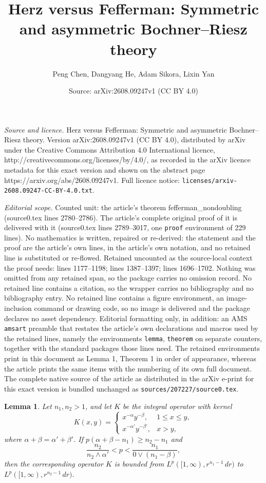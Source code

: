 \documentclass[10pt,a4paper]{amsart}
\title{Herz versus Fefferman: Symmetric and asymmetric Bochner--Riesz theory}
\author{Peng Chen, Dangyang He, Adam Sikora, Lixin Yan}
\date{Source: arXiv:2608.09247v1 (CC BY 4.0)}
\newtheorem{lemma}{Lemma}
\begin{document}
\maketitle

\noindent\emph{Source and licence.} Herz versus Fefferman: Symmetric and asymmetric Bochner--Riesz theory. Version arXiv:2608.09247v1 (CC BY 4.0), distributed by arXiv under the Creative Commons Attribution 4.0 International licence, http://creativecommons.org/licenses/by/4.0/, as recorded in the arXiv licence metadata for this exact version and shown on the abstract page https://arxiv.org/abs/2608.09247v1. Full licence notice: \texttt{licenses/arxiv-2608.09247-CC-BY-4.0.txt}.\par\smallskip

\noindent\textit{Editorial scope.} Counted unit: the article's theorem fefferman\_nondoubling (source0.tex lines 2780--2786). The article's complete original proof of it is delivered with it (source0.tex lines 2789--3017, one \texttt{proof} environment of 229 lines). No mathematics is written, repaired or re-derived: the statement and the proof are the article's own lines, in the article's own notation, and no retained line is substituted or re-flowed.  Retained uncounted as the source-local context the proof needs: lines 1177--1198; lines 1387--1397; lines 1696--1702.  Nothing was omitted from any retained span, so the package carries no omission record.  No retained line contains a citation, so the wrapper carries no bibliography and no bibliography entry.  No retained line contains a figure environment, an image-inclusion command or drawing code, so no image is delivered and the package declares no asset dependency.  Editorial formatting only, in addition: an AMS \texttt{amsart} preamble that restates the article's own declarations and macros used by the retained lines, namely the environments \texttt{lemma}, \texttt{theorem} on separate counters, together with the standard packages those lines need.  The retained environments print in this document as Lemma 1, Theorem 1 in order of appearance, whereas the article prints the same items with the numbering of its own full document.  The complete native source of the article as distributed in the arXiv e-print for this exact version is bundled unchanged as \texttt{sources/207227/source0.tex}.
\begin{lemma}\label{Nix}
Let $n_1,n_2>1$, and let $K$ be the integral operator with kernel
\begin{equation}
    K(x,y)=
    \begin{cases}
       x^{-\alpha}y^{-\beta}, & 1\le x\le y,\\
       x^{-\alpha'}y^{-\beta'}, & x>y,
    \end{cases}
\end{equation}
where $\alpha+\beta=\alpha'+\beta'$. If
\( p(\alpha+\beta-n_1)\ge n_2-n_1
\)
and
\begin{equation*}
    \frac{n_2}{n_2\wedge \alpha'}
    < p <
    \frac{n_1}{0\vee(n_1-\beta)},
\end{equation*}
then the corresponding operator $K$ is bounded from
$L^p([1,\infty),r^{n_1-1}\,dr)$ to $
    L^p([1,\infty),r^{n_2-1}\,dr).$
\end{lemma}
\end{document}
